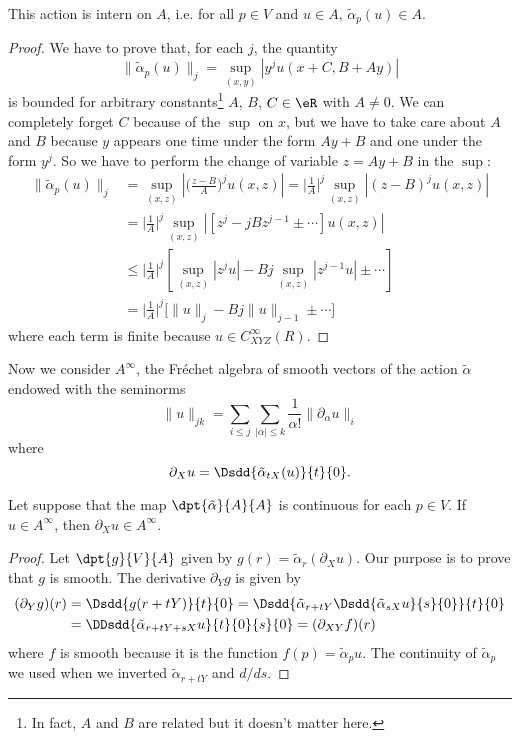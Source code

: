 \begin{lemma}
	This action is intern on $A$, i.e. for all $p\in V$ and $u\in A$, $\tilde\alpha_p(u)\in A$.
\end{lemma}

\begin{proof}
	We have to prove that, for each $j$, the quantity
	\[
		\| \tilde\alpha_p(u) \|_j=\sup_{(x,y)}| y^ju(x+C,B+Ay) |
	\]
	is bounded for arbitrary constants\footnote{In fact, $A$ and $B$ are related but it doesn't matter here.} $A$, $B$, $C\in\eR$ with $A\neq 0$. We can completely forget $C$ because of the $\sup$ on $x$, but we have to take care about $A$ and $B$ because $y$ appears one time under the form $Ay+B$ and one under the form $y^j$. So we have to perform the change of variable $z=Ay+B$ in the $\sup$:
	\begin{equation}
		\begin{split}
			\| \tilde\alpha_p(u) \|_j	&=\sup_{(x,z)}\left|   \Big( \frac{ z-B }{ A } \Big)^ju(x,z)    \right|
			=\Big| \frac{1}{ A }  \Big|^j\sup_{(x,z)}| (z-B)^ju(x,z) |\\
			&=\Big| \frac{1}{ A }  \Big|^j\sup_{(x,z)}| [z^j-jBz^{j-1}\pm\cdots]u(x,z) |\\
			&\leq\Big| \frac{1}{ A }  \Big|^j\left[  \sup_{(x,z)}| z^ju |-Bj\sup_{(x,z)}| z^{j-1}u |\pm\cdots  \right]\\
			&=\Big| \frac{1}{ A }  \Big|^j\big[  \| u \|_j-Bj\| u \|_{j-1}\pm\cdots   \big]
		\end{split}
	\end{equation}
	where each term is finite because $u\in C^{\infty}_{XYZ}(R)$.

\end{proof}

Now we consider $A^{\infty}$, the Fréchet algebra of smooth vectors of the action $\tilde\alpha$ endowed with the seminorms
\begin{equation}
	\| u \|_{jk}=\sum_{i\leq j}\sum_{| \alpha |\leq k}\frac{1}{ \alpha! }\| \partial_{\alpha}u \|_i
\end{equation}
where
\[
	\partial_Xu=\Dsdd{ \tilde\alpha_{tX}(u) }{t}{0}.
\]

\begin{lemma}
	Let suppose that the map $\dpt{ \tilde \alpha }{ A }{ A }$ is continuous for each $p\in V$. If $u\in A^{\infty}$, then $\partial_Xu\in A^{\infty}$.
\end{lemma}

\begin{proof}
	Let $\dpt{ g }{ V }{ A }$ given by $g(r)=\tilde\alpha_r(\partial_Xu)$. Our purpose is to prove that $g$ is smooth. The derivative $\partial_Yg$ is given by
	\[
		\begin{split}
			(\partial_Yg)(r)&=\Dsdd{ g(r+tY) }{t}{0}
			=\Dsdd{ \tilde\alpha_{r+tY} \Dsdd{ \tilde\alpha_{sX}u }{s}{0} }{t}{0}\\
			&=\DDsdd{ \tilde\alpha_{r+tY+sX}u }{t}{0}{s}{0}
			=(\partial_{XY}f)(r)
		\end{split}
	\]
	where $f$ is smooth because it is the function $f(p)=\tilde\alpha_pu$. The continuity of $\tilde\alpha_p$ we used when we inverted $\tilde\alpha_{r+tY}$ and $d/ds$.

\end{proof}

